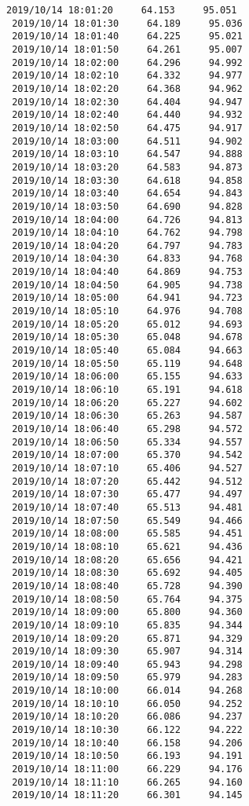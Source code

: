 \documentclass[11pt]{article}
\begin{document}
\begin{Verbatim}[commandchars=\\\{\}]
 2019/10/14 18:01:20     64.153     95.051
 2019/10/14 18:01:30     64.189     95.036
 2019/10/14 18:01:40     64.225     95.021
 2019/10/14 18:01:50     64.261     95.007
 2019/10/14 18:02:00     64.296     94.992
 2019/10/14 18:02:10     64.332     94.977
 2019/10/14 18:02:20     64.368     94.962
 2019/10/14 18:02:30     64.404     94.947
 2019/10/14 18:02:40     64.440     94.932
 2019/10/14 18:02:50     64.475     94.917
 2019/10/14 18:03:00     64.511     94.902
 2019/10/14 18:03:10     64.547     94.888
 2019/10/14 18:03:20     64.583     94.873
 2019/10/14 18:03:30     64.618     94.858
 2019/10/14 18:03:40     64.654     94.843
 2019/10/14 18:03:50     64.690     94.828
 2019/10/14 18:04:00     64.726     94.813
 2019/10/14 18:04:10     64.762     94.798
 2019/10/14 18:04:20     64.797     94.783
 2019/10/14 18:04:30     64.833     94.768
 2019/10/14 18:04:40     64.869     94.753
 2019/10/14 18:04:50     64.905     94.738
 2019/10/14 18:05:00     64.941     94.723
 2019/10/14 18:05:10     64.976     94.708
 2019/10/14 18:05:20     65.012     94.693
 2019/10/14 18:05:30     65.048     94.678
 2019/10/14 18:05:40     65.084     94.663
 2019/10/14 18:05:50     65.119     94.648
 2019/10/14 18:06:00     65.155     94.633
 2019/10/14 18:06:10     65.191     94.618
 2019/10/14 18:06:20     65.227     94.602
 2019/10/14 18:06:30     65.263     94.587
 2019/10/14 18:06:40     65.298     94.572
 2019/10/14 18:06:50     65.334     94.557
 2019/10/14 18:07:00     65.370     94.542
 2019/10/14 18:07:10     65.406     94.527
 2019/10/14 18:07:20     65.442     94.512
 2019/10/14 18:07:30     65.477     94.497
 2019/10/14 18:07:40     65.513     94.481
 2019/10/14 18:07:50     65.549     94.466
 2019/10/14 18:08:00     65.585     94.451
 2019/10/14 18:08:10     65.621     94.436
 2019/10/14 18:08:20     65.656     94.421
 2019/10/14 18:08:30     65.692     94.405
 2019/10/14 18:08:40     65.728     94.390
 2019/10/14 18:08:50     65.764     94.375
 2019/10/14 18:09:00     65.800     94.360
 2019/10/14 18:09:10     65.835     94.344
 2019/10/14 18:09:20     65.871     94.329
 2019/10/14 18:09:30     65.907     94.314
 2019/10/14 18:09:40     65.943     94.298
 2019/10/14 18:09:50     65.979     94.283
 2019/10/14 18:10:00     66.014     94.268
 2019/10/14 18:10:10     66.050     94.252
 2019/10/14 18:10:20     66.086     94.237
 2019/10/14 18:10:30     66.122     94.222
 2019/10/14 18:10:40     66.158     94.206
 2019/10/14 18:10:50     66.193     94.191
 2019/10/14 18:11:00     66.229     94.176
 2019/10/14 18:11:10     66.265     94.160
 2019/10/14 18:11:20     66.301     94.145

\end{Verbatim}
\end{document}
